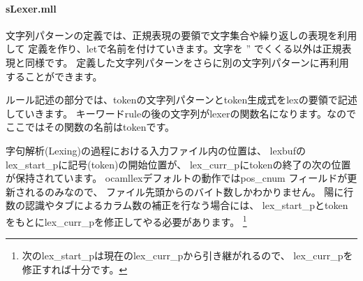 \documentclass[mingoth,a4paper]{jsarticle}
\begin{document}

\par
\paragraph{sLexer.mll}
文字列パターンの定義では、正規表現の要領で文字集合や繰り返しの表現を利用して
定義を作り、letで名前を付けていきます。文字を '' でくくる以外は正規表現と同様です。
定義した文字列パターンをさらに別の文字列パターンに再利用することができます。

ルール記述の部分では、tokenの文字列パターンとtoken生成式をlexの要領で記述していきます。
キーワードruleの後の文字列がlexerの関数名になります。なのでここではその関数の名前はtokenです。

字句解析(Lexing)の過程における入力ファイル内の位置は、
lexbufのlex\_start\_pに記号(token)の開始位置が、
lex\_curr\_pにtokenの終了の次の位置が保持されています。
ocamllexデフォルトの動作ではpos\_cnum フィールドが更新されるのみなので、
ファイル先頭からのバイト数しかわかりません。
陽に行数の認識やタブによるカラム数の補正を行なう場合には、
lex\_start\_pとtokenをもとにlex\_curr\_pを修正してやる必要があります。
\footnote{次のlex\_start\_pは現在のlex\_curr\_pから引き継がれるので、
lex\_curr\_pを修正すれば十分です。}
\end{document}
